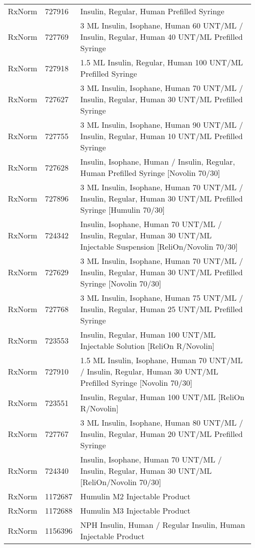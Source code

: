 \begin{longtable}{p{}p{}p{}}
  RxNorm & 727916 & Insulin, Regular, Human Prefilled Syringe \\ 
  RxNorm & 727769 & 3 ML Insulin, Isophane, Human 60 UNT/ML / Insulin, Regular, Human 40 UNT/ML Prefilled Syringe \\ 
  RxNorm & 727918 & 1.5 ML Insulin, Regular, Human 100 UNT/ML Prefilled Syringe \\ 
  RxNorm & 727627 & 3 ML Insulin, Isophane, Human 70 UNT/ML / Insulin, Regular, Human 30 UNT/ML Prefilled Syringe \\ 
  RxNorm & 727755 & 3 ML Insulin, Isophane, Human 90 UNT/ML / Insulin, Regular, Human 10 UNT/ML Prefilled Syringe \\ 
  RxNorm & 727628 & Insulin, Isophane, Human / Insulin, Regular, Human Prefilled Syringe [Novolin 70/30] \\ 
  RxNorm & 727896 & 3 ML Insulin, Isophane, Human 70 UNT/ML / Insulin, Regular, Human 30 UNT/ML Prefilled Syringe [Humulin 70/30] \\ 
  RxNorm & 724342 & Insulin, Isophane, Human 70 UNT/ML / Insulin, Regular, Human 30 UNT/ML Injectable Suspension [ReliOn/Novolin 70/30] \\ 
  RxNorm & 727629 & 3 ML Insulin, Isophane, Human 70 UNT/ML / Insulin, Regular, Human 30 UNT/ML Prefilled Syringe [Novolin 70/30] \\ 
  RxNorm & 727768 & 3 ML Insulin, Isophane, Human 75 UNT/ML / Insulin, Regular, Human 25 UNT/ML Prefilled Syringe \\ 
  RxNorm & 723553 & Insulin, Regular, Human 100 UNT/ML Injectable Solution [ReliOn R/Novolin] \\ 
  RxNorm & 727910 & 1.5 ML Insulin, Isophane, Human 70 UNT/ML / Insulin, Regular, Human 30 UNT/ML Prefilled Syringe [Novolin 70/30] \\ 
  RxNorm & 723551 & Insulin, Regular, Human 100 UNT/ML [ReliOn R/Novolin] \\ 
  RxNorm & 727767 & 3 ML Insulin, Isophane, Human 80 UNT/ML / Insulin, Regular, Human 20 UNT/ML Prefilled Syringe \\ 
  RxNorm & 724340 & Insulin, Isophane, Human 70 UNT/ML / Insulin, Regular, Human 30 UNT/ML [ReliOn/Novolin 70/30] \\ 
  RxNorm & 1172687 & Humulin M2 Injectable Product \\ 
  RxNorm & 1172688 & Humulin M3 Injectable Product \\ 
  RxNorm & 1156396 & NPH Insulin, Human / Regular Insulin, Human Injectable Product \\ 

\end{longtable}
